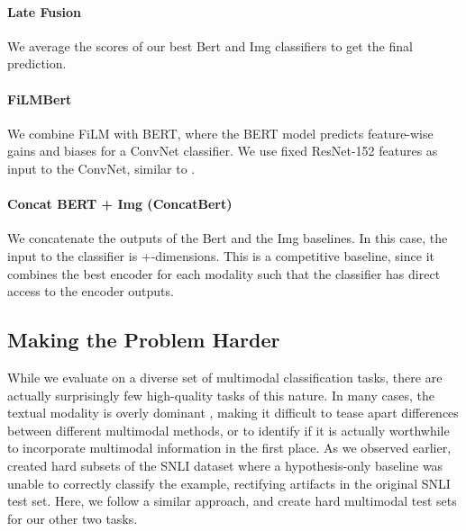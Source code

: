 \documentclass[11pt,a4paper]{article}
\begin{document}
\paragraph{Late Fusion} We average the scores of our best Bert and Img classifiers to get the final prediction.
\paragraph{FiLMBert} We combine FiLM \cite{Perez:2018film} with BERT, where the BERT model predicts feature-wise gains and biases for a ConvNet classifier. We use fixed ResNet-152 features as input to the ConvNet, similar to \citet{Perez:2018film}.
\paragraph{Concat BERT + Img (ConcatBert)} We concatenate the outputs of the Bert and the Img baselines. In this case, the input to the classifier is +-dimensions. This is a competitive baseline, since it combines the best encoder for each modality such that the classifier has direct access to the encoder outputs.

\subsection{Making the Problem Harder}

While we evaluate on a diverse set of multimodal classification tasks, there are actually surprisingly few high-quality tasks of this nature. In many cases, the textual modality is overly dominant \cite[this is even a problem in VQA; see][]{Goyal:2019vqamatter}, making it difficult to tease apart differences between different multimodal methods, or to identify if it is actually worthwhile to incorporate multimodal information in the first place. As we observed earlier,  created hard subsets of the SNLI dataset where a hypothesis-only baseline was unable to correctly classify the example, rectifying artifacts in the original SNLI test set. Here, we follow a similar approach, and create hard multimodal test sets for our other two tasks.
\end{document}

